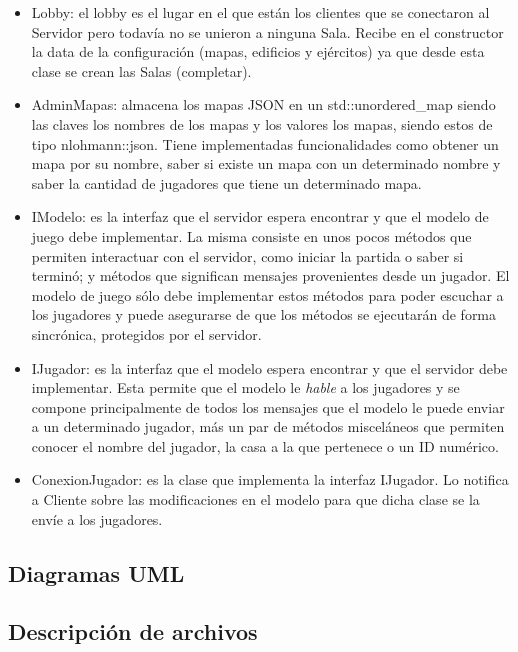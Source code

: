 \documentclass[titlepage,a4paper,12pt]{article}
\begin{document}
\begin{itemize}
\item Lobby: el lobby es el lugar en el que están los clientes que se conectaron al Servidor pero todavía no se unieron a ninguna Sala. Recibe en el constructor la data de la configuración (mapas, edificios y ejércitos) ya que desde esta clase se crean las Salas (completar).

\item AdminMapas: almacena los mapas JSON en un std::unordered\_map siendo las claves los nombres de los mapas y los valores los mapas, siendo estos de tipo nlohmann::json. Tiene implementadas funcionalidades como obtener un mapa por su nombre, saber si existe un mapa con un determinado nombre y saber la cantidad de jugadores que tiene un determinado mapa.

\item IModelo: es la interfaz que el servidor espera encontrar y que el modelo de juego debe implementar. La misma consiste en unos pocos métodos que permiten interactuar con el servidor, como iniciar la partida o saber si terminó; y métodos que significan mensajes provenientes desde un jugador. El modelo de juego sólo debe implementar estos métodos para poder escuchar a los jugadores y puede asegurarse de que los métodos se ejecutarán de forma sincrónica, protegidos por el servidor.

\item IJugador: es la interfaz que el modelo espera encontrar y que el servidor debe implementar. Esta permite que el modelo le \textit{hable} a los jugadores y se compone principalmente de todos los mensajes que el modelo le puede enviar a un determinado jugador, más un par de métodos misceláneos que permiten conocer el nombre del jugador, la casa a la que pertenece o un ID numérico.

\item ConexionJugador: es la clase que implementa la interfaz IJugador. Lo notifica a Cliente sobre las modificaciones en el modelo para que dicha clase se la envíe a los jugadores.

\end{itemize}

\subsection{Diagramas UML}

\subsection{Descripción de archivos}
\end{document}
